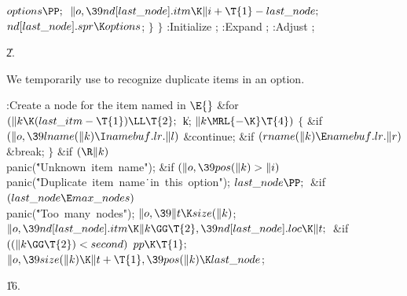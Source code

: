 ${}\\{options}\PP;{}$\6
${}\|o,\39\\{nd}[\\{last\_node}].\\{itm}\K\|i+\T{1}-\\{last\_node};{}$\6
${}\\{nd}[\\{last\_node}].\\{spr}\K\\{options}{}$;\6
\4${}\}{}$\2\6
\4${}\}{}$\2\6
:Initialize \X;\6
:Expand \X;\6
:Adjust \X;\par
\U2.\fi

We temporarily use  to recognize duplicate items in an
option.

\Y\B\4:Create a node for the item named in \X${}\E{}$\6
\&{for} ${}(\|k\K(\\{last\_itm}-\T{1})\LL\T{2};{}$ \|k; ${}\|k\MRL{-{\K}}%
\T{4}){}$\5
${}\{{}$\1\6
\&{if} ${}(\|o,\39\\{lname}(\|k)\I\\{namebuf}.\\{lr}.\|l){}$\1\5
\&{continue};\2\6
\&{if} ${}(\\{rname}(\|k)\E\\{namebuf}.\\{lr}.\|r){}$\1\5
\&{break};\2\6
\4${}\}{}$\2\6
\&{if} ${}(\R\|k){}$\1\5
\\{panic}(\.{"Unknown\ item\ name"});\2\6
\&{if} ${}(\|o,\39\\{pos}(\|k)>\|i){}$\1\5
\\{panic}(\.{"Duplicate\ item\ name}\)\.{\ in\ this\ option"});\2\6
${}\\{last\_node}\PP;{}$\6
\&{if} ${}(\\{last\_node}\E\\{max\_nodes}){}$\1\5
\\{panic}(\.{"Too\ many\ nodes"});\2\6
${}\|o,\39\|t\K\\{size}(\|k){}$;\6
${}\|o,\39\\{nd}[\\{last\_node}].\\{itm}\K\|k\GG\T{2},\39\\{nd}[\\{last%
\_node}].\\{loc}\K\|t;{}$\6
\&{if} ${}((\|k\GG\T{2})<\\{second}){}$\1\5
${}\\{pp}\K\T{1};{}$\2\6
${}\|o,\39\\{size}(\|k)\K\|t+\T{1},\39\\{pos}(\|k)\K\\{last\_node}{}$;\par
\U16.\fi

